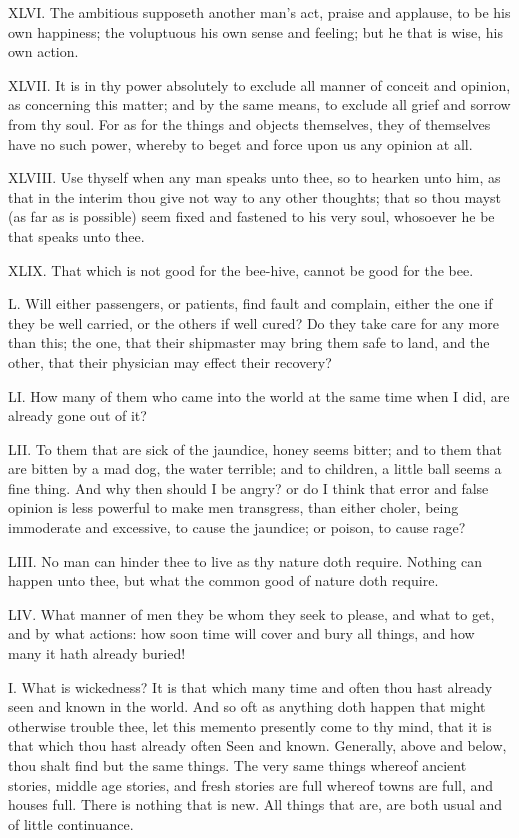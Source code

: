 XLVI. The ambitious supposeth another man's act, praise and applause, to
be his own happiness; the voluptuous his own sense and feeling; but he
that is wise, his own action.

XLVII. It is in thy power absolutely to exclude all manner of conceit
and opinion, as concerning this matter; and by the same means, to exclude
all grief and sorrow from thy soul. For as for the things and objects
themselves, they of themselves have no such power, whereby to beget and
force upon us any opinion at all.

XLVIII. Use thyself when any man speaks unto thee, so to hearken unto
him, as that in the interim thou give not way to any other thoughts; that
so thou mayst (as far as is possible) seem fixed and fastened to his very
soul, whosoever he be that speaks unto thee.

XLIX. That which is not good for the bee-hive, cannot be good for the
bee.

L. Will either passengers, or patients, find fault and complain, either
the one if they be well carried, or the others if well cured? Do they take
care for any more than this; the one, that their shipmaster may bring them
safe to land, and the other, that their physician may effect their
recovery?

LI. How many of them who came into the world at the same time when I
did, are already gone out of it?

LII. To them that are sick of the jaundice, honey seems bitter; and to
them that are bitten by a mad dog, the water terrible; and to children, a
little ball seems a fine thing. And why then should I be angry? or do I
think that error and false opinion is less powerful to make men
transgress, than either choler, being immoderate and excessive, to cause
the jaundice; or poison, to cause rage?

LIII. No man can hinder thee to live as thy nature doth require. Nothing
can happen unto thee, but what the common good of nature doth require.

LIV. What manner of men they be whom they seek to please, and what to
get, and by what actions: how soon time will cover and bury all things,
and how many it hath already buried!


I. What is wickedness? It is that which many time and often thou hast
already seen and known in the world. And so oft as anything doth happen
that might otherwise trouble thee, let this memento presently come to thy
mind, that it is that which thou hast already often Seen and known.
Generally, above and below, thou shalt find but the same things. The very
same things whereof ancient stories, middle age stories, and fresh stories
are full whereof towns are full, and houses full. There is nothing that is
new. All things that are, are both usual and of little continuance.

